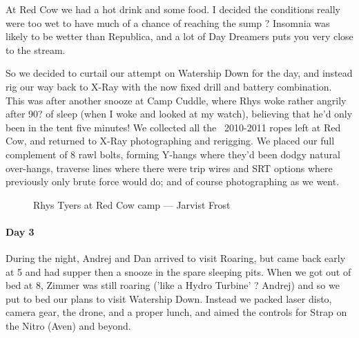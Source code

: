 At Red Cow we had a hot drink and some food. I decided the conditions really were too wet to have much of a chance of reaching the sump ? Insomnia was likely to be wetter than Republica, and a lot of Day Dreamers puts you very close to the stream.

So we decided to curtail our attempt on Watership Down for the day, and instead rig our way back to X-Ray with the now fixed drill and battery combination. This was after another snooze at Camp Cuddle, where Rhys woke rather angrily after 90? of sleep (when I woke and looked at my watch), believing that he'd only been in the tent five minutes!
We collected all the ~2010-2011 ropes left at Red Cow, and returned to X-Ray photographing and rerigging. We placed our full complement of 8 rawl bolts, forming Y-hangs where they'd been dodgy natural over-hangs, traverse lines where there were trip wires and SRT options where previously only brute force would do; and of course photographing as we went.


\begin{figure}[h]
\checkoddpage \ifoddpage \forcerectofloat \else \forceversofloat \fi
\centering
{}
\caption{Rhys Tyers at Red Cow camp --- Jarvist Frost}
\label{rhys red cow}
\end{figure}


\paragraph{Day 3}
During the night, Andrej and Dan arrived to visit Roaring, but came back early at 5 and had supper then a snooze in the spare sleeping pits. When we got out of bed at 8, Zimmer was still roaring ('like a Hydro Turbine' ? Andrej) and so we put to bed our plans to visit Watership Down. Instead we packed laser disto, camera gear, the drone, and a proper lunch, and aimed the controls for Strap on the Nitro (Aven) and beyond.

